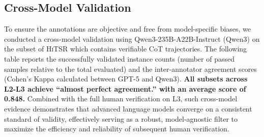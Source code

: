 \documentclass[11pt]{article}
\begin{document}
\subsection{Cross-Model Validation}
To ensure the annotations are objective and free from model-specific biases, we conducted a cross-model validation using Qwen3-235B-A22B-Instruct (Qwen3) on the subset of \textsc{HiTSR} which contains verifiable CoT trajectories. The following table reports the successfully validated instance counts (number of passed samples relative to the total evaluated) and the inter-annotator agreement scores (Cohen's Kappa calculated between GPT-5 and Qwen3). \textbf{All subsets across L2-L3 achieve ``almost perfect agreement.'' with an average score of 0.848.} Combined with the full human verification on L3, such cross-model evidence demonstrates that advanced language models converge on a consistent standard of validity, effectively serving as a robust, model-agnostic filter to maximize the efficiency and reliability of subsequent human verification.
\end{document}
